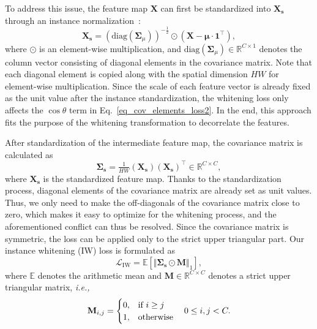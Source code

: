 \documentclass[final]{latex/cvpr}
\begin{document}
To address this issue, the feature map $\mathbf{X}$ can first be standardized into $\mathbf{X_s}$ through an instance normalization~\cite{ulyanov2016instance}:
\vspace{-0.1cm}
\begin{equation}\label{standardization}
\mathbf{X_s}=\left(\text{diag}(\mathbf{\Sigma}_{\mu})\right)^{-\frac{1}{2}}\odot(\mathbf{X}-\boldsymbol{\mu}\cdot{\mathbf{1}^\top}),
\end{equation}
where $\odot$ is an element-wise multiplication, and $\text{diag}(\mathbf{\Sigma}_{\mu})\in\mathbb{R}^{C\times1}$ denotes the column vector consisting of diagonal elements in the covariance matrix. Note that each diagonal element is copied along with the spatial dimension $HW$ for element-wise multiplication.
Since the scale of each feature vector is already fixed as the unit value after the instance standardization, the whitening loss only affects the $\cos\theta$ term in Eq.~\eqref{eq_cov_elements_loss2}. In the end, this approach fits the purpose of the whitening transformation to decorrelate the features.

After standardization of the intermediate feature map, the covariance matrix is calculated as
\begin{equation}\label{eq_mean_std_covariance}
\mathbf{\Sigma_s}=\tfrac{1}{HW}(\mathbf{X_s})(\mathbf{X_s})^\top\in\mathbb{R}^{C\times{C}},
\end{equation}
where $\mathbf{X_s}$ is the standardized feature map.
Thanks to the standardization process, diagonal elements of the covariance matrix are already set as unit values. Thus, we only need to make the off-diagonals of the covariance matrix close to zero, which makes it easy to optimize for the whitening process, and the aforementioned conflict can thus be resolved. Since the covariance matrix is symmetric, the loss can be applied only to the strict upper triangular part. Our instance whitening (IW) loss is formulated as
\begin{equation} \label{eq_our_whitening_loss}
\mathcal{L}_{\text{IW}} = \mathbb{E}[\Vert\mathbf{\Sigma_s}\odot\mathbf{M}\Vert_1],
\end{equation}
where $\mathbb{E}$ denotes the arithmetic mean and $\mathbf{M}\in\mathbb{R}^{C\times C}$ denotes a strict upper triangular matrix, \textit{i.e.,}
\begin{equation} \label{eq_mask}
\mathbf{M}_{i,j} =\begin{cases}
 0, & \text{if $i \geq j$}\\
 1, & \text{otherwise}
\end{cases} \quad
0\le i,j<C.
\vspace*{-0.1cm}
\end{equation}
\end{document}
